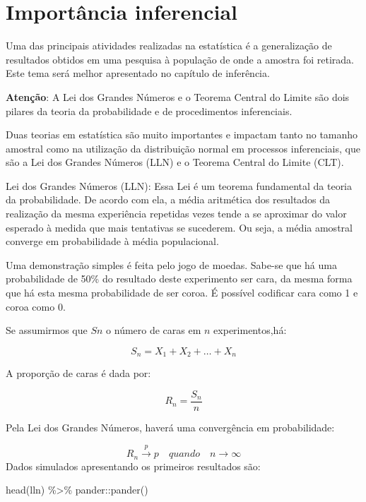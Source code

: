 \documentclass[
]{book}
\newenvironment{Shaded}{\begin{snugshade}}{\end{snugshade}}
\newcommand{\FunctionTok}[1]{\textcolor[rgb]{0.00,0.00,0.00}{#1}}
\newcommand{\NormalTok}[1]{#1}
\newcommand{\SpecialCharTok}[1]{\textcolor[rgb]{0.00,0.00,0.00}{#1}}
\begin{document}
\hypertarget{importuxe2ncia-inferencial}{%
\section{Importância inferencial}\label{importuxe2ncia-inferencial}}

Uma das principais atividades realizadas na estatística é a generalização de resultados obtidos em uma pesquisa à população de onde a amostra foi retirada. Este tema será melhor apresentado no capítulo de inferência.

\textbf{Atenção}: A Lei dos Grandes Números e o Teorema Central do Limite são dois pilares da teoria da probabilidade e de procedimentos inferenciais.

Duas teorias em estatística são muito importantes e impactam tanto no tamanho amostral como na utilização da distribuição normal em processos inferenciais, que são a Lei dos Grandes Números (LLN) e o Teorema Central do Limite (CLT).

Lei dos Grandes Números (LLN): Essa Lei é um teorema fundamental da teoria da probabilidade. De acordo com ela, a média aritmética dos resultados da realização da mesma experiência repetidas vezes tende a se aproximar do valor esperado à medida que mais tentativas se sucederem. Ou seja, a média amostral converge em probabilidade à média populacional.

Uma demonstração simples é feita pelo jogo de moedas. Sabe-se que há uma probabilidade de 50\% do resultado deste experimento ser cara, da mesma forma que há esta mesma probabilidade de ser coroa. É possível codificar cara como 1 e coroa como 0.

Se assumirmos que \(Sn\) o número de caras em \(n\) experimentos,há:

\[S_n = X_1 + X_2 + \dots + X_n\]

A proporção de caras é dada por:

\[R_n = \frac{S_n}{n}\]

Pela Lei dos Grandes Números, haverá uma convergência em probabilidade:

\[R_n \overset{p}{\to} p\quad quando \quad n \rightarrow \infty \]
Dados simulados apresentando os primeiros resultados são:

\begin{Shaded}
\begin{Highlighting}[]
\FunctionTok{head}\NormalTok{(lln) }\SpecialCharTok{\%\textgreater{}\%}\NormalTok{ pander}\SpecialCharTok{::}\FunctionTok{pander}\NormalTok{()}
\end{Highlighting}
\end{Shaded}
\end{document}
